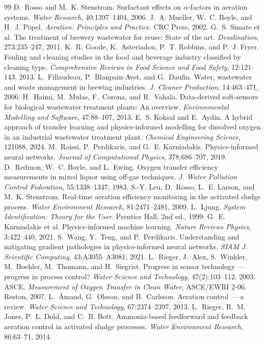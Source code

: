 \documentclass[11pt,a4paper]{article}
\begin{document}
\begin{thebibliography}{99}
 D.~Rosso and M.~K. Stenstrom. Surfactant effects on \(\alpha\)-factors in aeration systems. \textit{Water Research}, 40:1397--1404, 2006.
 J.~A. Mueller, W.~C. Boyle, and H.~J. P{\"o}pel. \textit{Aeration: Principles and Practice}. CRC Press, 2002.
 G.~S. Simate et al. The treatment of brewery wastewater for reuse: State of the art. \textit{Desalination}, 273:235--247, 2011.
 K.~R. Goode, K.~Asteriadou, P.~T. Robbins, and P.~J. Fryer. Fouling and cleaning studies in the food and beverage industry classified by cleaning type. \textit{Comprehensive Reviews in Food Science and Food Safety}, 12:121--143, 2013.
 L.~Fillaudeau, P.~Blanpain-Avet, and G.~Daufin. Water, wastewater and waste management in brewing industries. \textit{J. Cleaner Production}, 14:463--471, 2006.
 H.~Haimi, M.~Mulas, F.~Corona, and R.~Vahala. Data-derived soft-sensors for biological wastewater treatment plants: An overview. \textit{Environmental Modelling and Software}, 47:88--107, 2013.
 E.~S. Koksal and E.~Aydin. A hybrid approach of transfer learning and physics-informed modelling for dissolved oxygen in an industrial wastewater treatment plant. \textit{Chemical Engineering Science}, 121088, 2024.
 M.~Raissi, P.~Perdikaris, and G.~E. Karniadakis. Physics-informed neural networks. \textit{Journal of Computational Physics}, 378:686--707, 2019.
 D.~Redmon, W.~C. Boyle, and L.~Ewing. Oxygen transfer efficiency measurements in mixed liquor using off-gas techniques. \textit{J. Water Pollution Control Federation}, 55:1338--1347, 1983.
 S.-Y. Leu, D.~Rosso, L.~E. Larson, and M.~K. Stenstrom. Real-time aeration efficiency monitoring in the activated sludge process. \textit{Water Environment Research}, 81:2471--2481, 2009.
 L.~Ljung. \textit{System Identification: Theory for the User}. Prentice Hall, 2nd ed., 1999.
 G.~E. Karniadakis et al. Physics-informed machine learning. \textit{Nature Reviews Physics}, 3:422--440, 2021.
 S.~Wang, Y.~Teng, and P.~Perdikaris. Understanding and mitigating gradient pathologies in physics-informed neural networks. \textit{SIAM J. Scientific Computing}, 43:A3055--A3081, 2021.
 L.~Rieger, J.~Alex, S.~Winkler, M.~Boehler, M.~Thomann, and H.~Siegrist. Progress in sensor technology --- progress in process control? \textit{Water Science and Technology}, 47(2):103--112, 2003.
 ASCE. \textit{Measurement of Oxygen Transfer in Clean Water}, ASCE/EWRI 2-06. Reston, 2007.
 L.~{\AA}mand, G.~Olsson, and B.~Carlsson. Aeration control --- a review. \textit{Water Science and Technology}, 67:2374--2397, 2013.
 L.~Rieger, R.~M. Jones, P.~L. Dold, and C.~B. Bott. Ammonia-based feedforward and feedback aeration control in activated sludge processes. \textit{Water Environment Research}, 86:63--71, 2014.
\end{thebibliography}
\end{document}
